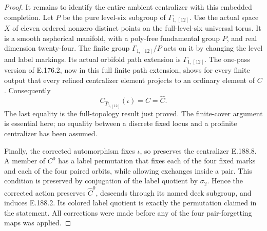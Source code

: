 \begin{proof}
It remains to identify the entire ambient centralizer
with this embedded completion.  Let \(P\) be the pure
level-six subgroup of \(\Gamma_{1,[12]}\).
Use the actual space \(X\) of eleven ordered nonzero
distinct points on the full-level-six universal torus.
It is a smooth aspherical manifold, with a poly-free
fundamental group \(P\), and real dimension twenty-four.
The finite group \(\Gamma_{1,[12]}/P\) acts on it by
changing the level and label markings.  Its actual
orbifold path extension is \(\Gamma_{1,[12]}\).
The one-pass version of E.176.2, now in this full
finite path extension, shows for every finite output
that every refined centralizer element projects to an
ordinary element of \(C\).  Consequently
\[
 C_{\widehat\Gamma_{1,[12]}}(\iota)=\overline C
                                              =\widehat C.
\tag{E.188.8}
\]
The last equality is the full-topology result just proved.
The finite-cover argument is essential here; no equality
between a discrete fixed locus and a profinite centralizer
has been assumed.

Finally, the corrected automorphism fixes \(\iota\), so
preserves the centralizer E.188.8.  A member of \(C^0\)
has a label permutation that fixes each of the four fixed
marks and each of the four paired orbits, while allowing
exchanges inside a pair.  This condition is preserved by
conjugation of the label quotient by \(\sigma_2\).
Hence the corrected action preserves \(\widehat C^0\),
descends through its named deck subgroup, and induces
E.188.2.  Its colored label quotient is exactly the
permutation claimed in the statement.  All corrections
were made before any of the four pair-forgetting maps
was applied.
\end{proof}
